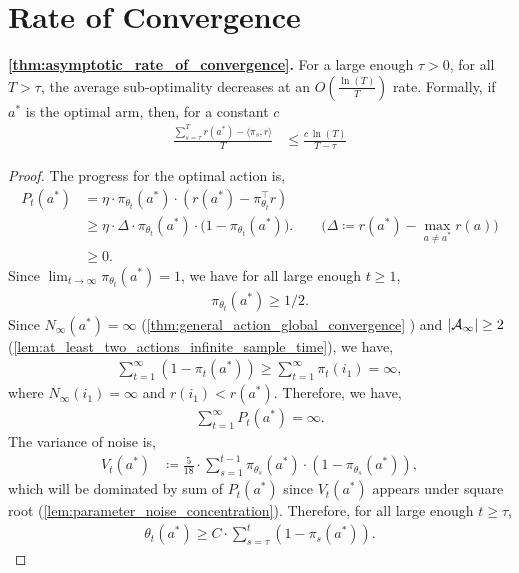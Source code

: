 \clearpage
\section{Rate of Convergence}


\textbf{\cref{thm:asymptotic_rate_of_convergence}.}
For a large enough $\tau > 0$, for all $T > \tau$, the average sub-optimality decreases at an $O\left(\frac{\ln(T)}{T} \right)$ rate. Formally, if $a^*$ is the optimal arm, then, for a constant $c$
\begin{align*}
\frac{\sum_{s=\tau}^{T} r(a^*) - \langle \pi_s, r \rangle}{T}  & \leq \frac{c \, \ln(T)}{T - \tau}
\end{align*}
\begin{proof}
The progress for the optimal action is,
\begin{align}
    P_t(a^*) &= \eta \cdot \pi_{\theta_t}(a^*) \cdot (r(a^*) -  \pi_{\theta_t}^\top r ) \\
    &\geq \eta \cdot \Delta \cdot \pi_{\theta_t}(a^*) \cdot \big( 1 - \pi_{\theta_t}(a^*) \big). \qquad \big( \Delta \coloneqq r(a^*) - \max_{a \neq a^*}{r(a)} \big) \\
    &\ge 0.
\end{align}
Since $\lim_{t \to \infty}{\pi_{\theta_t}(a^*)} = 1$, we have for all large enough $t \ge 1$,
\begin{align}
    \pi_{\theta_t}(a^*) \ge 1/2.
\end{align}
Since $N_\infty(a^*) = \infty$ (\cref{thm:general_action_global_convergence}
) and $|{\mathcal{A}}_\infty| \ge 2$ (\cref{lem:at_least_two_actions_infinite_sample_time}), we have,
\begin{align}
    \sum_{t=1}^{\infty}{(1 - \pi_t(a^*))} \ge \sum_{t=1}^{\infty}{\pi_t(i_1)} = \infty,
\end{align}
where $N_\infty(i_1) = \infty$ and $r(i_1) < r(a^*)$. Therefore, we have,
\begin{align}
    \sum_{t=1}^{\infty}{P_t(a^*)} = \infty.
\end{align}
The variance of noise is,
\begin{align}
    V_t(a^*) &\coloneqq \frac{5}{18} \cdot \sum_{s=1}^{t-1}  \pi_{\theta_s}(a^*) \cdot (1-\pi_{\theta_s}(a^*)),
\end{align}
which will be dominated by sum of $P_t(a^*)$ since $V_t(a^*)$ appears under square root (\cref{lem:parameter_noise_concentration}). Therefore, for all large enough $t \ge \tau$,
\begin{align}
    \theta_t(a^*) \ge C \cdot \sum_{s=\tau}^{t}{(1 - \pi_s(a^*))}.

\end{align}
\end{proof}
